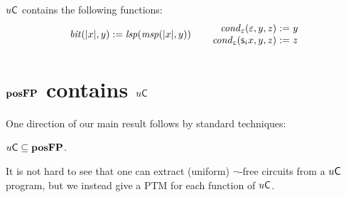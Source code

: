 \documentclass{lmcs}
\begin{document}
%
%
\begin{proposition}
	\label{prop:bits-and-tests-in-unicob}
	$u \mathsf{C}$ contains the following functions:
	\[
	\bit (|x| , y) \dfn \lsp (\msp (|x|, y) )
	\qquad
	\arraycolsep=1.5pt
	\begin{array}{rcl}
	\cond_\epsilon (\epsilon ,y,z) &\dfn& y 
	\\
	\cond_\epsilon (\succ i x ,y,z) &\dfn& z
	\end{array}
	\]
\end{proposition}
%





\section{$\mathbf{pos}\mathbf{FP}$ contains $u \mathsf{C}$}
\label{sect:posfp-contains-unicob}


One direction of our main result follows by standard techniques:
\begin{theorem}
	\label{thm:posfp-contains-unicob}
	$u \mathsf{C} \subseteq \mathbf{pos}\mathbf{FP}$.
\end{theorem}


It is not hard to see that one can extract (uniform) $\neg$-free circuits from a $u \mathsf{C}$ program,
 but we instead give a PTM for each function of $u \mathsf{C}$.
\end{document}

